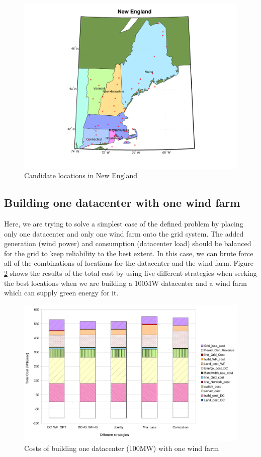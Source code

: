 \begin{figure}[ht]
\centering
\includegraphics[width=1\columnwidth]{img/NE_map}
\caption{Candidate locations in New England}
\label{fig:NE_locs}
\end{figure}

\subsection{Building one datacenter with one wind farm}

Here, we are trying to solve a simplest case of the defined problem by placing only one datacenter and only one wind farm onto the grid system. The added generation (wind power) and consumption (datacenter load) should be balanced for the grid to keep reliability to the best extent. In this case, we can brute force all of the combinations of locations for the datacenter and the wind farm. Figure \ref{fig:cost1dc1wf} shows the results of the total cost by using five different strategies when seeking the best locations when we are building a 100MW datacenter and a wind farm which can supply green energy for it.

\begin{figure}[ht]
\centering
\includegraphics[width=1\columnwidth]{img/cost-one-dc-one-wf}
\caption{Costs of building one datacenter (100MW) with one wind farm}
\label{fig:cost1dc1wf}
\end{figure}


